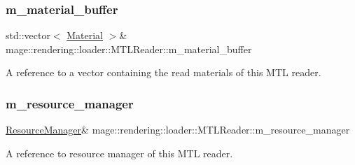 \subsubsection{\texorpdfstring{m\+\_\+material\+\_\+buffer}{m\_material\_buffer}}
{\footnotesize\ttfamily std\+::vector$<$ \mbox{\hyperlink{classmage_1_1rendering_1_1_material}{Material}} $>$\& mage\+::rendering\+::loader\+::\+M\+T\+L\+Reader\+::m\+\_\+material\+\_\+buffer\hspace{0.3cm}{\ttfamily [private]}}

A reference to a vector containing the read materials of this M\+TL reader. \mbox{\label{classmage_1_1rendering_1_1loader_1_1_m_t_l_reader_aa227ae7e44df08b1973171ff165eadb8}} 
\subsubsection{\texorpdfstring{m\+\_\+resource\+\_\+manager}{m\_resource\_manager}}
{\footnotesize\ttfamily \mbox{\hyperlink{classmage_1_1rendering_1_1_resource_manager}{Resource\+Manager}}\& mage\+::rendering\+::loader\+::\+M\+T\+L\+Reader\+::m\+\_\+resource\+\_\+manager\hspace{0.3cm}{\ttfamily [private]}}

A reference to resource manager of this M\+TL reader. 